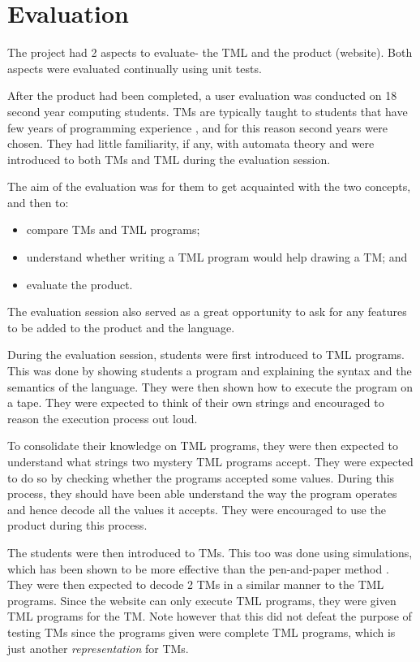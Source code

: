 \chapter{Evaluation} 

The project had 2 aspects to evaluate- the TML and the product (website). Both aspects were evaluated continually using unit tests.

After the product had been completed, a user evaluation was conducted on 18 second year computing students. TMs are typically taught to students that have few years of programming experience \citep{rodger2006jflap}, and for this reason second years were chosen. They had little familiarity, if any, with automata theory and were introduced to both TMs and TML during the evaluation session. 

The aim of the evaluation was for them to get acquainted with the two concepts, and then to:
\begin{itemize}
    \item compare TMs and TML programs;
    \item understand whether writing a TML program would help drawing a TM; and
    \item evaluate the product.
\end{itemize}
The evaluation session also served as a great opportunity to ask for any features to be added to the product and the language.

During the evaluation session, students were first introduced to TML programs. This was done by showing students a program and explaining the syntax and the semantics of the language. They were then shown how to execute the program on a tape. They were expected to think of their own strings and encouraged to reason the execution process out loud.

To consolidate their knowledge on TML programs, they were then expected to understand what strings two mystery TML programs accept. They were expected to do so by checking whether the programs accepted some values. During this process, they should have been able understand the way the program operates and hence decode all the values it accepts. They were encouraged to use the product during this process. 

The students were then introduced to TMs. This too was done using simulations, which has been shown to be more effective than the pen-and-paper method \citep{rodger2009increasing}. They were then expected to decode 2 TMs in a similar manner to the TML programs. Since the website can only execute TML programs, they were given TML programs for the TM. Note however that this did not defeat the purpose of testing TMs since the programs given were complete TML programs, which is just another \textit{representation} for TMs.

